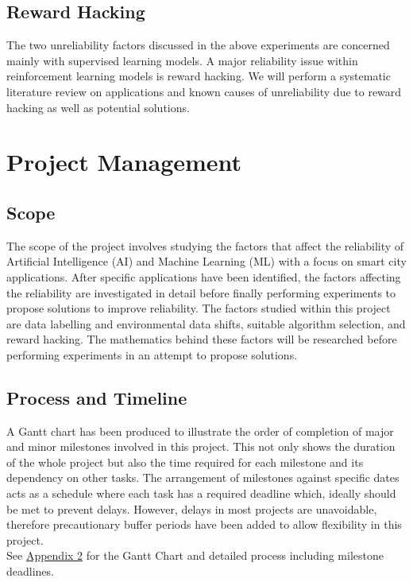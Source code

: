\documentclass[a4paper,12pt]{report}
\begin{document}
\section{Reward Hacking}
The two unreliability factors discussed in the above experiments are concerned mainly with supervised learning models. 
A major reliability issue within reinforcement learning models is reward hacking. 
We will perform a systematic literature review on applications and known causes of unreliability due to reward hacking as well as potential solutions.

\chapter{Project Management}
\section{Scope}
The scope of the project involves studying the factors that affect the reliability of Artificial Intelligence (AI) and Machine Learning (ML) with a focus on smart city applications. 
After specific applications have been identified, the factors affecting the reliability are investigated in detail before finally performing experiments to propose solutions to improve reliability. 
The factors studied within this project are data labelling and environmental data shifts, suitable algorithm selection, and reward hacking. 
The mathematics behind these factors will be researched before performing experiments in an attempt to propose solutions.

\section{Process and Timeline}
A Gantt chart has been produced to illustrate the order of completion of major and minor milestones involved in this project. 
This not only shows the duration of the whole project but also the time required for each milestone and its dependency on other tasks. 
The arrangement of milestones against specific dates acts as a schedule where each task has a required deadline which, ideally should be met to prevent delays. 
However, delays in most projects are unavoidable, therefore precautionary buffer periods have been added to allow flexibility in this project. \\

See \hyperref[sec:app2]{Appendix 2} for the Gantt Chart and detailed process including milestone deadlines. 
\end{document}
